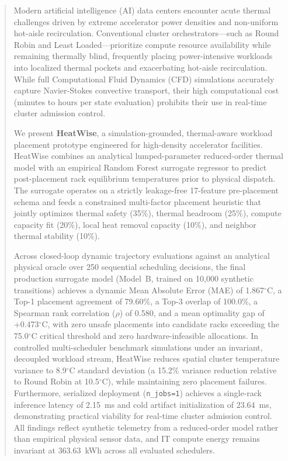 \documentclass[conference,10pt]{IEEEtran}
\begin{document}
\begin{abstract}
Modern artificial intelligence (AI) data centers encounter acute thermal challenges driven by extreme accelerator power densities and non-uniform hot-aisle recirculation. Conventional cluster orchestrators---such as Round Robin and Least Loaded---prioritize compute resource availability while remaining thermally blind, frequently placing power-intensive workloads into localized thermal pockets and exacerbating hot-aisle recirculation. While full Computational Fluid Dynamics (CFD) simulations accurately capture Navier-Stokes convective transport, their high computational cost (minutes to hours per state evaluation) prohibits their use in real-time cluster admission control.

We present \textbf{HeatWise}, a simulation-grounded, thermal-aware workload placement prototype engineered for high-density accelerator facilities. HeatWise combines an analytical lumped-parameter reduced-order thermal model with an empirical Random Forest surrogate regressor to predict post-placement rack equilibrium temperatures prior to physical dispatch. The surrogate operates on a strictly leakage-free 17-feature pre-placement schema and feeds a constrained multi-factor placement heuristic that jointly optimizes thermal safety (35\%), thermal headroom (25\%), compute capacity fit (20\%), local heat removal capacity (10\%), and neighbor thermal stability (10\%).

Across closed-loop dynamic trajectory evaluations against an analytical physical oracle over 250 sequential scheduling decisions, the final production surrogate model (Model~B, trained on 10,000 synthetic transitions) achieves a dynamic Mean Absolute Error (MAE) of 1.867$^\circ$C, a Top-1 placement agreement of 79.60\%, a Top-3 overlap of 100.0\%, a Spearman rank correlation ($\rho$) of 0.580, and a mean optimality gap of +0.473$^\circ$C, with zero unsafe placements into candidate racks exceeding the 75.0$^\circ$C critical threshold and zero hardware-infeasible allocations. In controlled multi-scheduler benchmark simulations under an invariant, decoupled workload stream, HeatWise reduces spatial cluster temperature variance to 8.9$^\circ$C standard deviation (a 15.2\% variance reduction relative to Round Robin at 10.5$^\circ$C), while maintaining zero placement failures. Furthermore, serialized deployment (\texttt{n\_jobs=1}) achieves a single-rack inference latency of 2.15~ms and cold artifact initialization of 23.64~ms, demonstrating practical viability for real-time cluster admission control. All findings reflect synthetic telemetry from a reduced-order model rather than empirical physical sensor data, and IT compute energy remains invariant at 363.63~kWh across all evaluated schedulers.
\end{abstract}
\end{document}

